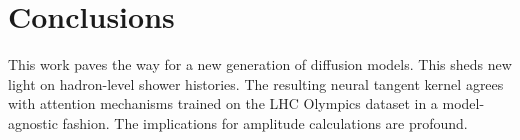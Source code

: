 \section{Conclusions}\label{sec:conclusions}

This work paves the way for a new generation of diffusion models. This
sheds new light on hadron-level shower histories. The resulting neural
tangent kernel agrees with attention mechanisms trained on the LHC
Olympics dataset in a model-agnostic fashion. The implications for
amplitude calculations are profound.

